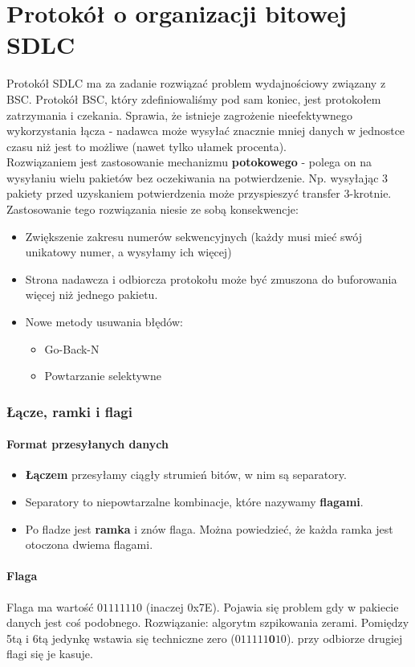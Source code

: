 \part{Protokół o organizacji bitowej SDLC}
	Protokół SDLC ma za zadanie rozwiązać problem wydajnościowy związany z BSC. Protokół BSC, który zdefiniowaliśmy pod sam koniec, jest protokołem zatrzymania i czekania. Sprawia, że istnieje zagrożenie nieefektywnego wykorzystania łącza - nadawca może wysyłać znacznie mniej danych w jednostce czasu niż jest to możliwe (nawet tylko ułamek procenta).\\
	Rozwiązaniem jest zastosowanie mechanizmu \textbf{potokowego} - polega on na wysyłaniu wielu pakietów bez oczekiwania na potwierdzenie. Np. wysyłając 3 pakiety przed uzyskaniem potwierdzenia może przyspieszyć transfer 3-krotnie.\\
	Zastosowanie tego rozwiązania niesie ze sobą konsekwencje:
	\begin{itemize}
		\item Zwiększenie zakresu numerów sekwencyjnych (każdy musi mieć swój unikatowy numer, a wysyłamy ich więcej)
		\item Strona nadawcza i odbiorcza protokołu może być zmuszona do buforowania więcej niż jednego pakietu.
		\item Nowe metody usuwania błędów:
		\begin{itemize}
			\item Go-Back-N
			\item Powtarzanie selektywne
		\end{itemize}
	\end{itemize}
	\section{Łącze, ramki i flagi}
		\subsection{Format przesyłanych danych}
			\begin{itemize}
				\item \textbf{Łączem} przesyłamy ciągły strumień bitów, w nim są separatory.
				\item Separatory to niepowtarzalne kombinacje, które nazywamy \textbf{flagami}.
				\item Po fladze jest \textbf{ramka} i znów flaga. Można powiedzieć, że każda ramka jest otoczona dwiema flagami.
			\end{itemize}
		\subsection{Flaga}
			Flaga ma wartość $ 01111110 $ (inaczej 0x7E). Pojawia się problem gdy w pakiecie danych jest coś podobnego. Rozwiązanie: algorytm szpikowania zerami. Pomiędzy 5tą i 6tą jedynkę wstawia się techniczne zero ($ 011111\textbf{0}10 $). przy odbiorze drugiej flagi się je kasuje.
